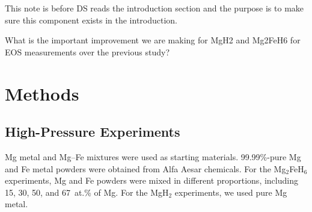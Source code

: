 \documentclass[draft,jgrga,12pt]{agujournal2019}
\begin{document}



\begin{cbox}
    This note is before DS reads the introduction section and the purpose is to make sure this component exists in the introduction.

    What is the important improvement we are making for MgH2 and Mg2FeH6 for EOS measurements over the previous study?\\
\end{cbox}


\section{Methods}

\subsection{High-Pressure Experiments}

Mg metal and Mg–Fe mixtures were used as starting materials.
99.99\%-pure Mg and Fe metal powders were obtained from Alfa Aesar chemicals. 
For the Mg$_2$FeH$_6$ experiments, Mg and Fe powders were mixed  in different proportions, including 15, 30, 50, and 67~{at.\%} of Mg. 
For the MgH$_2$ experiments, we used pure Mg metal.
\end{document}
